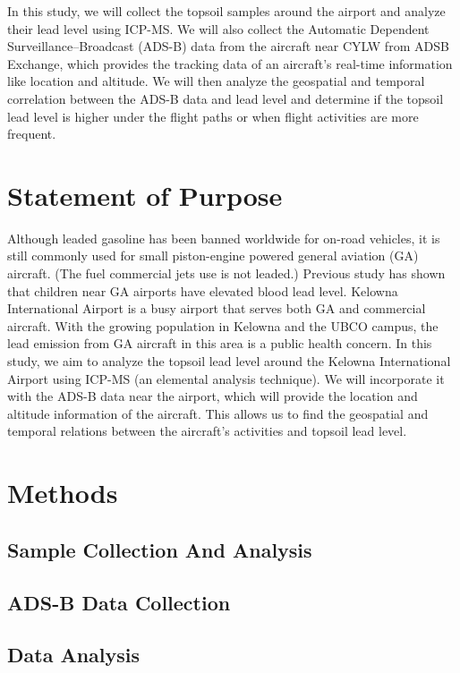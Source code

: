 \documentclass[12pt]{article}
\begin{document}
In this study, we will collect the topsoil samples around the airport and analyze their lead level using ICP-MS. We will also collect the Automatic Dependent Surveillance–Broadcast (ADS-B) data from the aircraft near CYLW from ADSB Exchange\cite{adsbexchange}, which provides the tracking data of an aircraft's real-time information like location and altitude. We will then analyze the geospatial and temporal correlation between the ADS-B data and lead level and determine if the topsoil lead level is higher under the flight paths or when flight activities are more frequent. 
\section{Statement of Purpose}
Although leaded gasoline has been banned worldwide for on-road vehicles, it is still commonly used for small piston-engine powered general aviation (GA) aircraft. (The fuel commercial jets use is not leaded.) Previous study has shown that children near GA airports have elevated blood lead level.\cite{miranda_geospatial_2011} \cite{zahran_leaded_2023} \cite{mills_lead_2022} \cite{zahran_effect_2017} Kelowna International Airport is a busy airport that serves both GA and commercial aircraft. With the growing population in Kelowna and the UBCO campus, the lead emission from GA aircraft in this area is a public health concern. In this study, we aim to analyze the topsoil lead level around the Kelowna International Airport using ICP-MS (an elemental analysis technique). We will incorporate it with the ADS-B data near the airport, which will provide the location and altitude information of the aircraft. This allows us to find the geospatial and temporal relations between the aircraft's activities and topsoil lead level.
\section{Methods}
\subsection{Sample Collection And Analysis}
\subsection{ADS-B Data Collection}
\subsection{Data Analysis}
\newpage
\printbibliography
\end{document}
